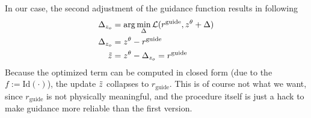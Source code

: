 \documentclass[a4paper,12pt]{article}
\begin{document}
In our case, the second adjustment of the guidance function results in following
\begin{align*}
    \Delta_{z_o} &= \arg\min_\Delta \mathcal{L}(r^{\text{guide}}, z^\theta + \Delta) \\
    \Delta_{z_o} &= z^\theta - r^{\text{guide}} \\
    \Tilde{z} &= z^\theta - \Delta_{z_o} = r^{\text{guide}}
\end{align*}
Because the optimized term can be computed in closed form (due to the $f:=\text{Id}(\cdot)$), the update $\Tilde{z}$ collapses to $r_{\text{guide}}$.
This is of course not what we want, since $r_{\text{guide}}$ is not physically meaningful, and the procedure itself is just a hack to make guidance more reliable than the first version.


% 
% 
\end{document}
